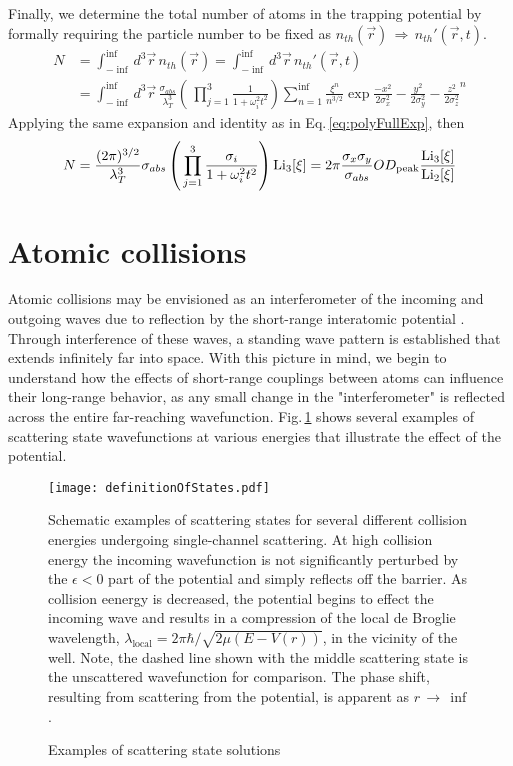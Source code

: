 Finally, we determine the total number of atoms in the trapping potential by formally requiring the particle number to be fixed as $n_{th}(\vec{r})\,\Rightarrow\,n_{th}'(\vec{r},t)$.
\begin{equation}
\begin{split}
	N&=\int_{-\inf}^{\inf} d^3\vec{r}\, n_{th}(\vec{r}) = \int_{-\inf}^{\inf} d^3\vec{r}\, n_{th}'(\vec{r},t) \\
&=\int_{-\inf}^{\inf} d^3\vec{r}\, \frac{\sigma_{abs}}{\lambda_T^3} \left( \, \prod_{j=1}^3 \frac{1}{1+\omega_i^2t^2}\right) \sum_{n=1}^{\inf} \frac{\xi^n}{n^{3/2}} \exp{\frac{-x^2}{2\sigma_x^2} - \frac{y^2}{2\sigma_y^2} - \frac{z^2}{2\sigma_z^2}}^n
\end{split}
\end{equation}
Applying the same expansion and identity as in Eq.\,\ref{eq:polyFullExp}, then
\begin{equation}
	N=\frac{(2\pi)^{3/2}}{\lambda_T^3}  \sigma_{abs} \left( \, \prod_{j=1}^3 \frac{\sigma_i}{1+\omega_i^2t^2}\right) \text{Li}_{3}\!\left[ \xi \right] 
	= 2\pi \frac{\sigma_x \sigma_y}{\sigma_{abs}} OD_{\text{peak}}\frac{\text{Li}_{3}\!\left[ \xi \right]}{\text{Li}_{2}\!\left[ \xi \right]}
\end{equation}

\section{Atomic collisions} \label{sec:cold_collisions}
Atomic collisions may be envisioned as an interferometer of the incoming and outgoing waves due to reflection by the short-range interatomic potential \cite{Jones2006}.
Through interference of these waves, a standing wave pattern is established that extends infinitely far into space.
With this picture in mind, we begin to understand how the effects of short-range couplings between atoms can influence their long-range behavior, as any small change in the "interferometer" is reflected across the entire far-reaching wavefunction.
Fig.\,\ref{fig:3collwf} shows several examples of scattering state wavefunctions at various energies that illustrate the effect of the potential.
\begin{figure} 
	\centerline{
	\texttt{[image: definitionOfStates.pdf]}}
	\caption{Examples of scattering state solutions}{Schematic examples of scattering states for several different collision energies undergoing single-channel scattering. At high collision energy the incoming wavefunction is not significantly perturbed by the $\epsilon<0$ part of the potential and simply reflects off the barrier. As collision eenergy is decreased, the potential begins to effect the incoming wave and results in a compression of the local de Broglie wavelength, $\lambda_{\text{local}} = 2\pi\hbar/\sqrt{2\mu(E-V(r))}$, in the vicinity of the well. Note, the dashed line shown with the middle scattering state is the unscattered wavefunction for comparison. The phase shift, resulting from scattering from the potential, is apparent as $r\,\rightarrow\,\inf$.}
	\label{fig:3collwf}
\end{figure} 

